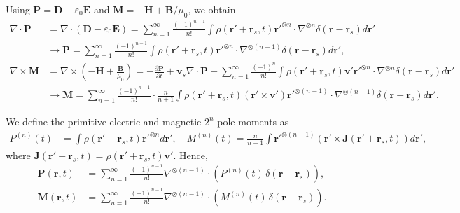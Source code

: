 \documentclass{article}
\begin{document}
	Using $\bm{P} = \bm{D} - \varepsilon_0 \bm{E}$ and $\bm{M} = -\bm{H} + \bm{B}/\mu_0$, we obtain
	\[
	\begin{split}
		\nabla \cdot \bm{P} 
		&= \nabla \cdot \left( \bm{D} - \varepsilon_0 \bm{E} \right) 
		= \sum_{n=1}^{\infty} \frac{(-1)^{n-1}}{n!} 
		\int \rho\!\left( \bm{r}' + \bm{r}_s, t \right) 
		\bm{r}'^{\otimes n} \cdot \nabla^{\otimes n} 
		\delta\!\left( \bm{r} - \bm{r}_s \right) d\bm{r}' \\
		&\to \bm{P} 
		= \sum_{n=1}^{\infty} \frac{(-1)^{n-1}}{n!} 
		\int \rho\!\left( \bm{r}' + \bm{r}_s, t \right) 
		\bm{r}'^{\otimes n} \cdot \nabla^{\otimes (n-1)} 
		\delta\!\left( \bm{r} - \bm{r}_s \right) d\bm{r}', \\
		\nabla \times \bm{M} 
		&= \nabla \times \left( -\bm{H} + \frac{\bm{B}}{\mu_0} \right) 
		= -\frac{\partial \bm{P}}{\partial t} + \bm{v}_s \nabla \cdot \bm{P} 
		+ \sum_{n=1}^{\infty} \frac{(-1)^n}{n!} 
		\int \rho\!\left( \bm{r}' + \bm{r}_s, t \right) 
		\bm{v}' \bm{r}'^{\otimes n} \cdot \nabla^{\otimes n} 
		\delta\!\left( \bm{r} - \bm{r}_s \right) d\bm{r}' \\
		&\to \bm{M} 
		= \sum_{n=1}^{\infty} \frac{(-1)^{n-1}}{n!} \cdot \frac{n}{n+1} 
		\int \rho\!\left( \bm{r}' + \bm{r}_s, t \right) 
		\left( \bm{r}' \times \bm{v}' \right) 
		\bm{r}'^{\otimes (n-1)} \cdot \nabla^{\otimes (n-1)} 
		\delta\!\left( \bm{r} - \bm{r}_s \right) d\bm{r}'.
	\end{split}
	\]
	
	We define the primitive electric and magnetic $2^n$-pole moments as
	\[
	\begin{split}
		P^{(n)}(t) &= \int \rho\!\left( \bm{r}' + \bm{r}_s, t \right) \bm{r}'^{\otimes n} d\bm{r}', \quad
		M^{(n)}(t) = \frac{n}{n+1} \int \bm{r}'^{\otimes (n-1)} \left( \bm{r}' \times \bm{J}\!\left( \bm{r}' + \bm{r}_s, t \right) \right) d\bm{r}',
	\end{split}
	\]
	where $\bm{J}\!\left( \bm{r}' + \bm{r}_s, t \right) = \rho\!\left( \bm{r}' + \bm{r}_s, t \right) \bm{v}'$. Hence, 
	\[
	\begin{split}
		\bm{P}(\bm{r}, t) &= \sum_{n=1}^{\infty} \frac{(-1)^{n-1}}{n!} 
		\nabla^{\otimes (n-1)} \cdot 
		\left( P^{(n)}(t)\, \delta\!\left( \bm{r} - \bm{r}_s \right) \right), \\
		\bm{M}(\bm{r}, t) &= \sum_{n=1}^{\infty} \frac{(-1)^{n-1}}{n!} 
		\nabla^{\otimes (n-1)} \cdot 
		\left( M^{(n)}(t)\, \delta\!\left( \bm{r} - \bm{r}_s \right) \right).
	\end{split}
	\]
	
\end{document}
